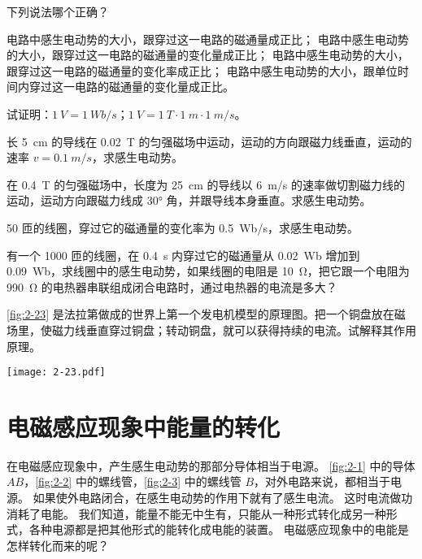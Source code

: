 \begin{Practice}
\begin{question}
  \item 下列说法哪个正确？
  \begin{tasks}
    \task 电路中感生电动势的大小，跟穿过这一电路的磁通量成正比；
    \task 电路中感生电动势的大小，跟穿过这一电路的磁通量的变化量成正比；
    \task 电路中感生电动势的大小，跟穿过这一电路的磁通量的变化率成正比；
    \task 电路中感生电动势的大小，跟单位时间内穿过这一电路的磁通量的变化量成正比。
  \end{tasks}
  \item 试证明：$\qty{1}{V}=\qty{1}{Wb/s}$；$\qty{1}{V}=\qty{1}{T}\cdot \qty{1}{m}\cdot \qty{1}{m/s}$。
  \item  长 \qty{5}{cm} 的导线在 \qty{0.02}{T} 的匀强磁场中运动，运动的方向跟磁力线垂直，运动的速率 $v=\qty{0.1}{m/s}$，求感生电动势。
  \item 在 \qty{0.4}{T} 的匀强磁场中，长度为 \qty{25}{cm} 的导线以 \qty{6}{m/s} 的速率做切割磁力线的运动，运动方向跟磁力线成 \ang{30} 角，并跟导线本身垂直。求感生电动势。
  \item 50 匝的线圈，穿过它的磁通量的变化率为 \qty{0.5}{Wb/s}，求感生电动势。
  \item 有一个 1000 匝的线圈，在 \qty{0.4}{s} 内穿过它的磁通量从 \qty{0.02}{Wb} 增加到 \qty{0.09}{Wb}，求线圈中的感生电动势，如果线圈的电阻是 \qty{10}{\ohm}，把它跟一个电阻为 \qty{990}{\ohm} 的电热器串联组成闭合电路时，通过电热器的电流是多大？
  \item \cref{fig:2-23} 是法拉第做成的世界上第一个发电机模型的原理图。把一个铜盘放在磁场里，使磁力线垂直穿过铜盘；转动铜盘，就可以获得持续的电流。试解释其作用原理。
  \begin{figurehere}
    \begin{minipage}{\linewidth}\centering
      \texttt{[image: 2-23.pdf]}
      \caption{}\label{fig:2-23}
    \end{minipage}
  \end{figurehere}
\end{question}
\end{Practice}

\section{电磁感应现象中能量的转化}

在电磁感应现象中，产生感生电动势的那部分导体相当于电源。
\cref{fig:2-1} 中的导体 $AB$，\cref{fig:2-2} 中的螺线管，\cref{fig:2-3} 中的螺线管 $B$，对外电路来说，都相当于电源。
如果使外电路闭合，在感生电动势的作用下就有了感生电流。
这时电流做功消耗了电能。
我们知道，能量不能无中生有，只能从一种形式转化成另一种形式，各种电源都是把其他形式的能转化成电能的装置。
电磁感应现象中的电能是怎样转化而来的呢？

